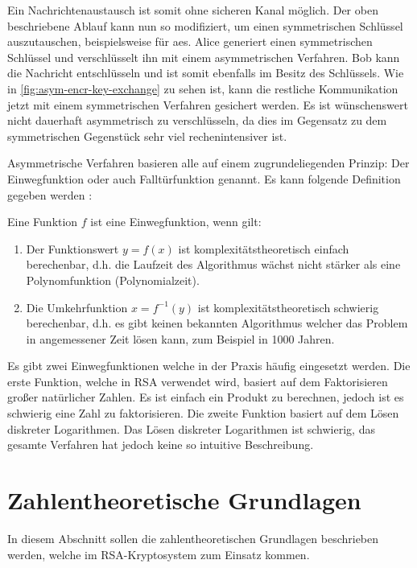 

\noindent
Ein Nachrichtenaustausch ist somit ohne sicheren Kanal möglich. Der oben beschriebene
Ablauf kann nun so modifiziert, um einen symmetrischen Schlüssel auszutauschen, beispielsweise
für \acs{aes}. Alice generiert einen symmetrischen Schlüssel und verschlüsselt ihn mit einem
asymmetrischen Verfahren. Bob kann die Nachricht entschlüsseln und ist somit ebenfalls
im Besitz des Schlüssels. Wie in \autoref{fig:asym-encr-key-exchange} zu sehen ist,
kann die restliche Kommunikation jetzt mit einem symmetrischen
Verfahren gesichert werden. Es ist wünschenswert nicht dauerhaft asymmetrisch
zu verschlüsseln, da dies im Gegensatz zu dem symmetrischen Gegenstück sehr viel
rechenintensiver ist.
\newpage



\noindent
Asymmetrische Verfahren basieren alle auf einem zugrundeliegenden Prinzip:
Der Einwegfunktion oder auch Falltürfunktion genannt. Es kann folgende
Definition gegeben werden \parencite[153]{BOOK:crypto}:

\begin{definition}[Einwegfunktion]
  Eine Funktion $f$ ist eine Einwegfunktion, wenn gilt:
  \begin{enumerate}
    \item Der Funktionswert $y = f(x)$ ist komplexitätstheoretisch einfach berechenbar,
          d.h. die Laufzeit des Algorithmus wächst
          nicht stärker als eine Polynomfunktion (Polynomialzeit).
    \item Die Umkehrfunktion $x = f^{-1}(y)$ ist komplexitätstheoretisch schwierig berechenbar,
          d.h. es gibt keinen bekannten Algorithmus welcher das Problem in angemessener
          Zeit lösen kann, zum Beispiel in 1000 Jahren.
  \end{enumerate}
\end{definition}

\noindent
Es gibt zwei Einwegfunktionen welche in der Praxis häufig eingesetzt werden.
Die erste Funktion, welche in RSA verwendet wird,
basiert auf dem Faktorisieren großer natürlicher Zahlen.
Es ist einfach ein Produkt zu berechnen, jedoch ist es schwierig eine Zahl zu
faktorisieren. Die zweite Funktion basiert auf dem Lösen diskreter Logarithmen.
Das Lösen diskreter Logarithmen ist schwierig, das gesamte Verfahren
hat jedoch keine so intuitive Beschreibung.

\section{Zahlentheoretische Grundlagen}
In diesem Abschnitt sollen die zahlentheoretischen Grundlagen beschrieben werden,
welche im RSA-Kryptosystem zum Einsatz kommen.

